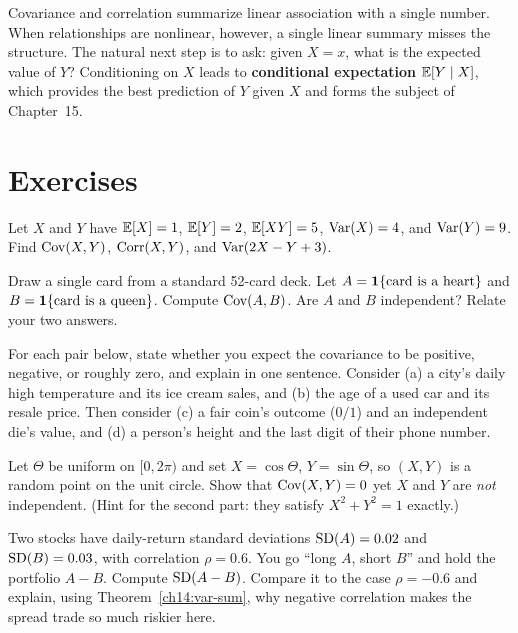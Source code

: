 Covariance and correlation summarize linear association with a single number.
When relationships are nonlinear, however, a single linear summary misses the structure.
The natural next step is to ask: given $X = x$, what is the expected value of $Y$?
Conditioning on $X$ leads to \textbf{conditional expectation} $\operatorname{\mathbb{E}}[Y \mid X]$,
which provides the best prediction of $Y$ given $X$ and forms the subject of Chapter~15.

\section{Exercises}
\label{ch14:exercises}

\begin{exercise}
\label{ch14:ex-warmup}
Let $X$ and $Y$ have $\operatorname{\mathbb{E}}[X] = 1$, $\operatorname{\mathbb{E}}[Y] = 2$, $\operatorname{\mathbb{E}}[XY] = 5$, $\operatorname{Var}(X) = 4$, and
$\operatorname{Var}(Y) = 9$. Find $\operatorname{Cov}(X,Y)$, $\operatorname{Corr}(X,Y)$, and $\operatorname{Var}(2X - Y + 3)$.
\end{exercise}

\begin{exercise}
\label{ch14:ex-indicator}
Draw a single card from a standard 52-card deck. Let $A = \mathbf{1}\{\text{card is a
heart}\}$ and $B = \mathbf{1}\{\text{card is a queen}\}$. Compute $\operatorname{Cov}(A, B)$. Are $A$
and $B$ independent? Relate your two answers.
\end{exercise}

\begin{exercise}
\label{ch14:ex-sign}
For each pair below, state whether you expect the covariance to be positive,
negative, or roughly zero, and explain in one sentence. Consider (a) a city's
daily high temperature and its ice cream sales, and (b) the age of a used car and
its resale price. Then consider (c) a fair coin's outcome ($0/1$) and an
independent die's value, and (d) a person's height and the last digit of their
phone number.
\end{exercise}

\begin{exercise}
\label{ch14:ex-uncorr}
Let $\Theta$ be uniform on $[0, 2\pi)$ and set $X = \cos\Theta$, $Y = \sin\Theta$,
so $(X, Y)$ is a random point on the unit circle. Show that $\operatorname{Cov}(X, Y) = 0$ yet
$X$ and $Y$ are \emph{not} independent. (Hint for the second part: they satisfy
$X^2 + Y^2 = 1$ exactly.)
\end{exercise}

\begin{exercise}
\label{ch14:ex-diff}
Two stocks have daily-return standard deviations $\operatorname{SD}(A) = 0.02$ and $\operatorname{SD}(B) =
0.03$, with correlation $\rho = 0.6$. You go ``long $A$, short $B$'' and hold the
portfolio $A - B$. Compute $\operatorname{SD}(A - B)$. Compare it to the case $\rho = -0.6$ and
explain, using Theorem~\ref{ch14:var-sum}, why negative correlation makes the spread
trade so much riskier here.
\end{exercise}

